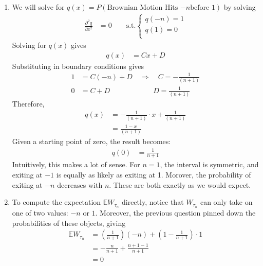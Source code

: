 \documentclass[12pt]{article}
\theoremstyle{plain}
\theoremstyle{definition}
\theoremstyle{remark}
\begin{document}
\begin{enumerate}
\begin{enumerate}
      \item %
        We will solve for $q(x) = P(\text{Brownian Motion Hits $-n$
        before 1})$ by solving
        \begin{align*}
          \frac{\partial^2 q}{\partial x^2}
          &= 0
          \qquad
          \text{s.t.}
          \begin{cases}
            q(-n) = 1 \\
            q(1)  = 0 \\
          \end{cases}
        \end{align*}
        Solving for $q(x)$ gives
        \begin{align*}
          q(x) &= Cx + D
        \end{align*}
        Substituting in boundary conditions gives
        \begin{align*}
          1 &= C(-n) + D
          \quad \Rightarrow \quad
          C = -\frac{1}{(n+1)}\\
          0 &= C + D
          \quad\qquad\qquad\quad
          D = \frac{1}{(n+1)}
        \end{align*}
        Therefore,
        \begin{align*}
          q(x) &= -\frac{1}{(n+1)}\cdot x + \frac{1}{(n+1)}\\
               &= \frac{1-x}{(n+1)}
        \end{align*}
        Given a starting point of zero, the result becomes:
        \begin{align*}
          q(0) &= \frac{1}{n+1}
        \end{align*}
        Intuitively, this makes a lot of sense. For $n=1$, the interval
        is symmetric, and exiting at $-1$ is equally as likely as
        exiting at 1. Morover, the probability of exiting at $-n$
        decreases with $n$. These are both exactly as we would expect.

      \item %
        To compute the expectation $\mathbb{E}W_{\tau_n}$ directly,
        notice that $W_{\tau_n}$ can only take on one of two values:
        $-n$ or $1$. Moreover, the previous question pinned down the
        probabilities of these objects, giving
        \begin{align*}
          \mathbb{E}W_{\tau_n}
          &=
          \left(\frac{1}{n+1}\right)(-n)
          + \left(1-\frac{1}{n+1}\right)\cdot 1\\
          &=
          -\frac{n}{n+1}
          + \frac{n+1 - 1}{n+1}\\
          &= 0
        \end{align*}
    \end{enumerate}


\end{enumerate}
\end{document}
